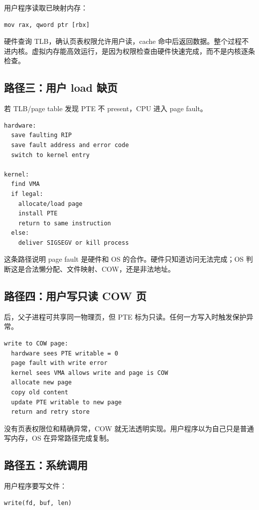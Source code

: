 用户程序读取已映射内存：

\begin{lstlisting}
mov rax, qword ptr [rbx]
\end{lstlisting}

硬件查询 TLB，确认页表权限允许用户读，cache 命中后返回数据。整个过程不进内核。虚拟内存能高效运行，是因为权限检查由硬件快速完成，而不是内核逐条检查。

\subsection{路径三：用户 load 缺页}

若 TLB/page table 发现 PTE 不 present，CPU 进入 page fault。

\begin{lstlisting}
hardware:
  save faulting RIP
  save fault address and error code
  switch to kernel entry

kernel:
  find VMA
  if legal:
    allocate/load page
    install PTE
    return to same instruction
  else:
    deliver SIGSEGV or kill process
\end{lstlisting}

这条路径说明 page fault 是硬件和 OS 的合作。硬件只知道访问无法完成；OS 判断这是合法懒分配、文件映射、COW，还是非法地址。

\subsection{路径四：用户写只读 COW 页}

 后，父子进程可共享同一物理页，但 PTE 标为只读。任何一方写入时触发保护异常。

\begin{lstlisting}
write to COW page:
  hardware sees PTE writable = 0
  page fault with write error
  kernel sees VMA allows write and page is COW
  allocate new page
  copy old content
  update PTE writable to new page
  return and retry store
\end{lstlisting}

没有页表权限位和精确异常，COW 就无法透明实现。用户程序以为自己只是普通写内存，OS 在异常路径完成复制。

\subsection{路径五：系统调用}

用户程序要写文件：

\begin{lstlisting}
write(fd, buf, len)
\end{lstlisting}

